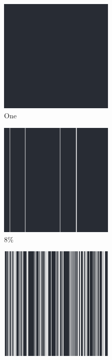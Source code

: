 \documentclass[12pt, fleqn]{report}                             %
\theoremstyle{break}                                            %
\begin{document}
      \begin{figure}[ht!]
        \centering
        \begin{subfigure}[b]{0.4\linewidth}
          \includegraphics[width=0.6\textwidth]{Images/200/a.png}
          \caption{One}
        \end{subfigure}
        \begin{subfigure}[b]{0.4\linewidth}
          \includegraphics[width=0.6\textwidth]{Images/200/b.png}
          \caption{8\%}
        \end{subfigure}
        \begin{subfigure}[b]{0.4\linewidth}
          \includegraphics[width=0.6\textwidth]{Images/200/c.png}

\end{subfigure}
\end{figure}
\end{document}
